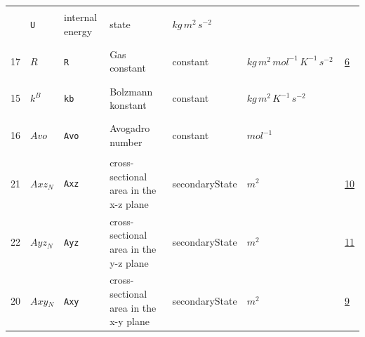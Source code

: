 \begin{longtable}{|p{1cm}|p{2.5cm}|p{4.5cm}|p{8cm}|p{3.0cm}|p{3cm}|p{1cm}|}
             & \verb|U|
             & internal energy
             & \begin{lay}state \end{lay}
             & $ kg \,m^{2} \,s^{-2} \, $
             & \\
            17
             & \hypertarget{"v:17"}{ $ {R}{_{}} $}
             & \verb|R|
             & Gas constant
             & \begin{lay}constant \end{lay}
             & $ kg \,m^{2} \,mol^{-1} \,K^{-1} \,s^{-2} \, $
             &                 \hyperlink{"e:6"}{ 6 }
                 \\
            15
             & \hypertarget{"v:15"}{ $ {{k^B}}{_{}} $}
             & \verb|kb|
             & Bolzmann konstant
             & \begin{lay}constant \end{lay}
             & $ kg \,m^{2} \,K^{-1} \,s^{-2} \, $
             & \\
            16
             & \hypertarget{"v:16"}{ $ {Avo}{_{}} $}
             & \verb|Avo|
             & Avogadro number
             & \begin{lay}constant \end{lay}
             & $ mol^{-1} \, $
             & \\
            21
             & \hypertarget{"v:21"}{ $ {Axz}{_{N}} $}
             & \verb|Axz|
             & cross-sectional area in the x-z plane
             & \begin{lay}secondaryState \end{lay}
             & $ m^{2} \, $
             &                 \hyperlink{"e:10"}{ 10 }
                 \\
            22
             & \hypertarget{"v:22"}{ $ {Ayz}{_{N}} $}
             & \verb|Ayz|
             & cross-sectional area in the y-z plane
             & \begin{lay}secondaryState \end{lay}
             & $ m^{2} \, $
             &                 \hyperlink{"e:11"}{ 11 }
                 \\
            20
             & \hypertarget{"v:20"}{ $ {Axy}{_{N}} $}
             & \verb|Axy|
             & cross-sectional area in the x-y plane
             & \begin{lay}secondaryState \end{lay}
             & $ m^{2} \, $
             &                 \hyperlink{"e:9"}{ 9 }
                 \\
    \end{longtable}